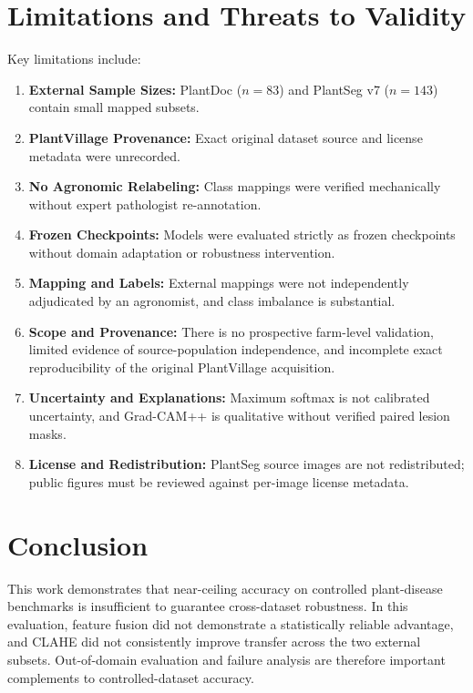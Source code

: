 \documentclass[10pt,journal,compsoc]{IEEEtran}
\begin{document}
\begin{table}[t]
\begin{table}[t]
\section{Limitations and Threats to Validity}
Key limitations include:
\begin{enumerate}
    \item \textbf{External Sample Sizes:} PlantDoc ($n=83$) and PlantSeg v7 ($n=143$) contain small mapped subsets.
    \item \textbf{PlantVillage Provenance:} Exact original dataset source and license metadata were unrecorded.
    \item \textbf{No Agronomic Relabeling:} Class mappings were verified mechanically without expert pathologist re-annotation.
    \item \textbf{Frozen Checkpoints:} Models were evaluated strictly as frozen checkpoints without domain adaptation or robustness intervention.
    \item \textbf{Mapping and Labels:} External mappings were not independently adjudicated by an agronomist, and class imbalance is substantial.
    \item \textbf{Scope and Provenance:} There is no prospective farm-level validation, limited evidence of source-population independence, and incomplete exact reproducibility of the original PlantVillage acquisition.
    \item \textbf{Uncertainty and Explanations:} Maximum softmax is not calibrated uncertainty, and Grad-CAM++ is qualitative without verified paired lesion masks.
    \item \textbf{License and Redistribution:} PlantSeg source images are not redistributed; public figures must be reviewed against per-image license metadata.
\end{enumerate}

\section{Conclusion}
This work demonstrates that near-ceiling accuracy on controlled plant-disease benchmarks is insufficient to guarantee cross-dataset robustness. In this evaluation, feature fusion did not demonstrate a statistically reliable advantage, and CLAHE did not consistently improve transfer across the two external subsets. Out-of-domain evaluation and failure analysis are therefore important complements to controlled-dataset accuracy.


\end{table}
\end{table}
\end{document}
